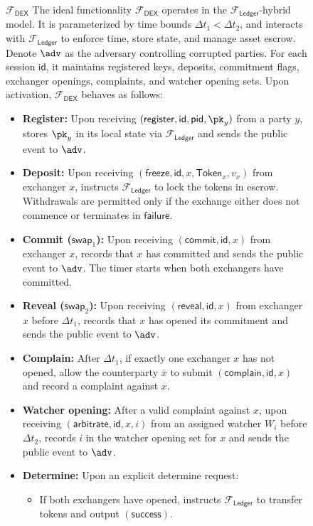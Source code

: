\documentclass[runningheads]{llncs}
\newcommand{\dex}{\mathcal{F}_{\mathsf{DEX}}}
\newcommand{\swapid}{\mathsf{id}}
\begin{document}
\begin{figure}[!h]
\begin{functionality2}{$\dex$}
The ideal functionality $\mathcal{F}_{\mathsf{DEX}}$ operates in the $\mathcal{F}_{\mathsf{Ledger}}$-hybrid model.
It is parameterized by time bounds $\Delta t_1 < \Delta t_2$, and interacts with $\mathcal{F}_{\mathsf{Ledger}}$ to enforce time, store state, and manage asset escrow. Denote $\adv$ as the adversary controlling corrupted parties. For each session $\swapid$, it maintains registered keys, deposits, commitment flags, exchanger openings, complaints, and watcher opening sets.
Upon activation, $\mathcal{F}_{\mathsf{DEX}}$ behaves as follows:
\begin{itemize}
    \item \textbf{Register:} Upon receiving $(\mathsf{register}, \swapid, \mathsf{pid}, \pk_y)$ from a party $y$, stores $\pk_y$ in its local state via $\mathcal{F}_{\mathsf{Ledger}}$ and sends the public event to $\adv$.
    \item \textbf{Deposit:} Upon receiving $(\mathsf{freeze}, \swapid, x, \mathsf{Token}_x, v_x)$ from exchanger $x$, instructs $\mathcal{F}_{\mathsf{Ledger}}$ to lock the tokens in escrow. Withdrawals are permitted only if the exchange either does not commence or terminates in $\mathsf{failure}$.
    \item \textbf{Commit (\(\mathsf{swap}_1\)):} Upon receiving $(\mathsf{commit}, \swapid, x)$ from exchanger $x$, records that $x$ has committed and sends the public event to $\adv$. The timer starts when both exchangers have committed.
    \item \textbf{Reveal (\(\mathsf{swap}_2\)):} Upon receiving $(\mathsf{reveal}, \swapid, x)$ from exchanger $x$ before $\Delta t_1$, records that $x$ has opened its commitment and sends the public event to $\adv$.
    \item \textbf{Complain:} After $\Delta t_1$, if exactly one exchanger $x$ has not opened, allow the counterparty $\bar{x}$ to submit $(\mathsf{complain}, \swapid, x)$ and record a complaint against $x$.
    \item \textbf{Watcher opening:} After a valid complaint against $x$, upon receiving $(\mathsf{arbitrate}, \swapid, x, i)$ from an assigned watcher $W_i$ before $\Delta t_2$, records $i$ in the watcher opening set for $x$ and sends the public event to $\adv$.
    \item \textbf{Determine:} Upon an explicit determine request:
    \begin{itemize}
        \item If both exchangers have opened, instructs $\mathcal{F}_{\mathsf{Ledger}}$ to transfer tokens and output $(\mathsf{success})$.

\end{itemize}
\end{itemize}
\end{functionality2}
\end{figure}
\end{document}
